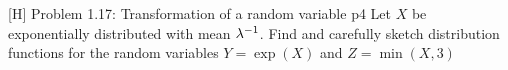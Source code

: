 \documentclass[a4paper, 11pt]{article}
\begin{document}
\begin{problem}{%
		[H] Problem 1.17: Transformation of a random variable
	}{p4%
	}
Let $X$ be exponentially distributed with mean $\lambda^{-1}$. Find and carefully sketch  distribution functions for the random variables $Y=\exp(X)$ and $Z=\min(X,3)$
\end{problem}
\end{document}
